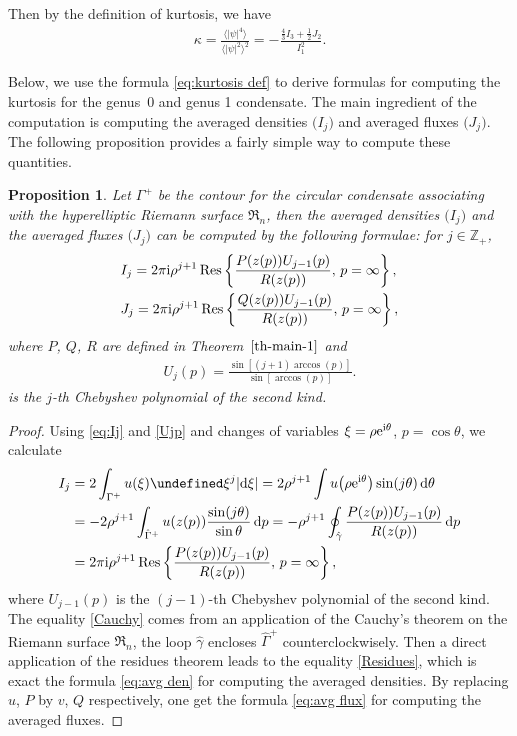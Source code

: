 \documentclass[10pt,a4paper]{amsart}
\numberwithin{equation}{section}
\newtheorem{Proposition}[Theorem]{Proposition}
\let\Im\undefined
\DeclareMathOperator{\Im}{Im}
\newcommand{\G}{\Gamma}
\newcommand{\Res}{\operatorname{Res}}
\def\G{\Gamma}
\begin{document}
Then by the definition of kurtosis, we have
\begin{align}
\kappa=\frac{\bigl\langle|\psi|^4\bigr\rangle}{\bigl\langle|\psi|^2\bigr\rangle^2}=-\frac{\frac{4}{3}I_3+\frac{1}{2}J_2}{I_1^2}.\label{eq:kurtosis def}
\end{align}

Below, we use the formula \eqref{eq:kurtosis def} to derive formulas for computing the kurtosis for the genus~0 and genus 1 condensate. The main ingredient of the computation is computing the averaged densities $\bigl(I_j\bigr)$ and averaged fluxes $\bigl(J_j\bigr)$. The following proposition provides a fairly simple way to compute these quantities.

\begin{Proposition}\label{prop:avg den}
Let $\G^+$ be the contour for the circular condensate associating with the hyperelliptic Riemann surface $\mathfrak{R}_n$, then the averaged densities $\bigl(I_j\bigr)$ and the averaged fluxes $\bigl(J_j\bigr)$ can be computed by the following formulae: for $j\in \mathbb{Z}_+$,
\begin{align}
&I_j=2\pi {\rm i} \rho^{j+1}\Res\left\{\frac{P(z(p))U_{j-1}(p)}{R(z(p))},\,p=\infty\right\},\label{eq:avg den}\\
&J_j=2\pi {\rm i} \rho^{j+1}\Res\left\{\frac{Q(z(p))U_{j-1}(p)}{R(z(p))},\,p=\infty\right\},\label{eq:avg flux}
\end{align}
where $P$, $Q$, $R$ are defined in Theorem~$\ref{th-main-1}$ and
\begin{align}\label{Ujp}
U_j(p)=\frac{\sin[(j+1)\arccos(p)]}{\sin[\arccos(p)]}.
\end{align}
is the $j$-th Chebyshev polynomial of the second kind.
\end{Proposition}
\begin{proof}
Using \eqref{eq:Ij} and \eqref{Ujp} and changes of variables $\xi=\rho {\rm e}^{{\rm i}\theta}$, $p=\cos\theta$, we calculate
\begin{align}
I_j&= 2\int_{\G^+}u(\xi)\Im \xi^j|{\rm d}\xi|
=2\rho^{j+1}\int u\bigl(\rho {\rm e}^{{\rm i} \theta}\bigr)\sin(j\theta) \,{\rm d}\theta
\nonumber\\
& = -2\rho^{j+1}\int_{\hat\G^+}u(z(p))\frac{\sin(j\theta)}{\sin\theta}\,{\rm d}p
=-\rho^{j+1}\oint_{\hat\gamma}\frac{P(z(p))U_{j-1}(p)}{R(z(p))}\,{\rm d}p\label{Cauchy}\\
&= 2\pi {\rm i} \rho^{j+1}\Res\left\{\frac{P(z(p))U_{j-1}(p)}{R(z(p))},\,p=\infty\right\}\label{Residues},
\end{align}
where $U_{j-1}(p)$ is the $(j-1)$-th Chebyshev polynomial of the second kind. The equality \eqref{Cauchy} comes from an application of the Cauchy's theorem on the Riemann surface $\mathfrak{R}_n$, the loop $\hat \gamma$ encloses $\hat\G^+$ counterclockwisely. Then a direct application of the residues theorem leads to the equality \eqref{Residues}, which is exact the formula \eqref{eq:avg den} for computing the averaged densities. By replacing $u$, $P$ by $v$, $Q$ respectively, one get the formula \eqref{eq:avg flux} for computing the averaged fluxes.
\end{proof}
\end{document}

